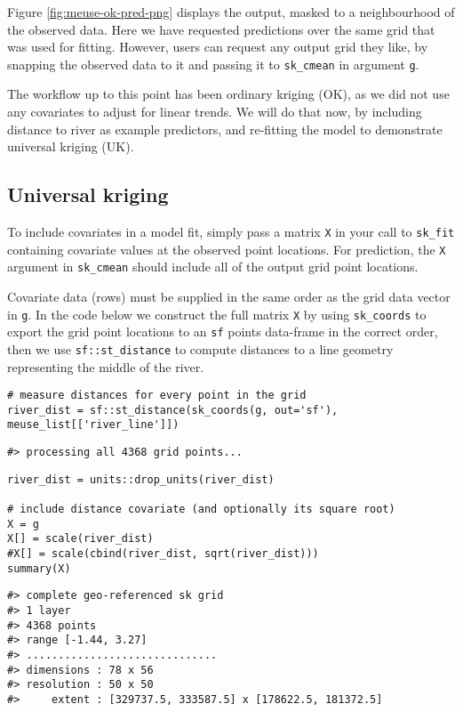 Figure \ref{fig:meuse-ok-pred-png} displays the output, masked to a neighbourhood of the observed data. Here we have requested predictions over the same grid that was used for fitting. However, users can request any output grid they like, by snapping the observed data to it and passing it to \texttt{sk\_cmean} in argument \texttt{g}.

The workflow up to this point has been ordinary kriging (OK), as we did not use any covariates to adjust for linear trends. We will do that now, by including distance to river as example predictors, and re-fitting the model to demonstrate universal kriging (UK).

\hypertarget{universal-kriging}{%
\subsection{Universal kriging}\label{universal-kriging}}

To include covariates in a model fit, simply pass a matrix \texttt{X} in your call to \texttt{sk\_fit} containing covariate values at the observed point locations. For prediction, the \texttt{X} argument in \texttt{sk\_cmean} should include all of the output grid point locations.

Covariate data (rows) must be supplied in the same order as the grid data vector in \texttt{g}. In the code below we construct the full matrix \texttt{X} by using \texttt{sk\_coords} to export the grid point locations to an \texttt{sf} points data-frame in the correct order, then we use \texttt{sf::st\_distance} to compute distances to a line geometry representing the middle of the river.

\begin{verbatim}
# measure distances for every point in the grid
river_dist = sf::st_distance(sk_coords(g, out='sf'), meuse_list[['river_line']])
\end{verbatim}

\begin{verbatim}
#> processing all 4368 grid points...
\end{verbatim}

\begin{verbatim}
river_dist = units::drop_units(river_dist)

# include distance covariate (and optionally its square root)
X = g
X[] = scale(river_dist)
#X[] = scale(cbind(river_dist, sqrt(river_dist)))
summary(X)
\end{verbatim}

\begin{verbatim}
#> complete geo-referenced sk grid
#> 1 layer
#> 4368 points
#> range [-1.44, 3.27]
#> ..............................
#> dimensions : 78 x 56
#> resolution : 50 x 50
#>     extent : [329737.5, 333587.5] x [178622.5, 181372.5]
\end{verbatim}

